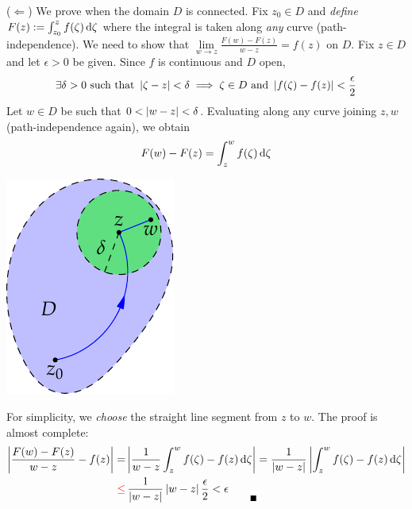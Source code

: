 \begin{tcolorbox}[proofstyle]
	\begin{description}
		\begin{minipage}[t]{0.76\linewidth}\vspace{0pt}
			\item[\normalfont ($\Leftarrow$)] We prove when the domain $D$ is connected.\footnotemark{} Fix $z_0\in D$ and \emph{define} $F(z):=\int_{z_0}^zf(\zeta)\,\mathrm{d}\zeta$ where the integral is taken along \emph{any} curve (path-independence). We need to show that $\lim\limits_{w\to z}\frac{F(w)-F(z)}{w-z}=f(z)$ on $D$.\smallbreak
			Fix $z\in D$ and let $\epsilon>0$ be given. Since $f$ is continuous and $D$ open,
			\[
				\exists \delta>0\ \text{such that}\  \nm{\zeta-z}<\delta\implies \zeta\in D\ \text{and}\ \nm{f(\zeta)-f(z)}<\frac\epsilon 2
			\]
			Let $w\in D$ be such that $0<\left| w-z\right|<\delta$. Evaluating along any curve joining $z,w$ (path-independence again), we obtain
			\[
				F(w)-F(z)=\int_z^wf(\zeta)\,\mathrm{d}\zeta
			\]
			\end{minipage}
			\hfill
			\begin{minipage}[t]{0.22\linewidth}\vspace{0pt}
				\flushright\includegraphics[scale=0.95]{ftc-2}
			\end{minipage}\medbreak
			For simplicity, we \emph{choose} the straight line segment from $z$ to $w$. The proof is almost complete:
			\begin{align*}
				\nm{\frac{F(w)-F(z)}{w-z}-f(z)}=&\nm{\frac 1{w-z}\int_z^wf(\zeta)-f(z)\,\D\zeta} = \frac 1{\nm{w-z}}\nm{\int_z^wf(\zeta)-f(z)\,\D\zeta}\\
				\textcolor{red}{\le}&\,\frac 1{\nm{w-z}}\nm{w-z}\frac\epsilon 2<\epsilon \tag*{\qedsymbol}
			\end{align*}
		\end{description}
\end{tcolorbox}

